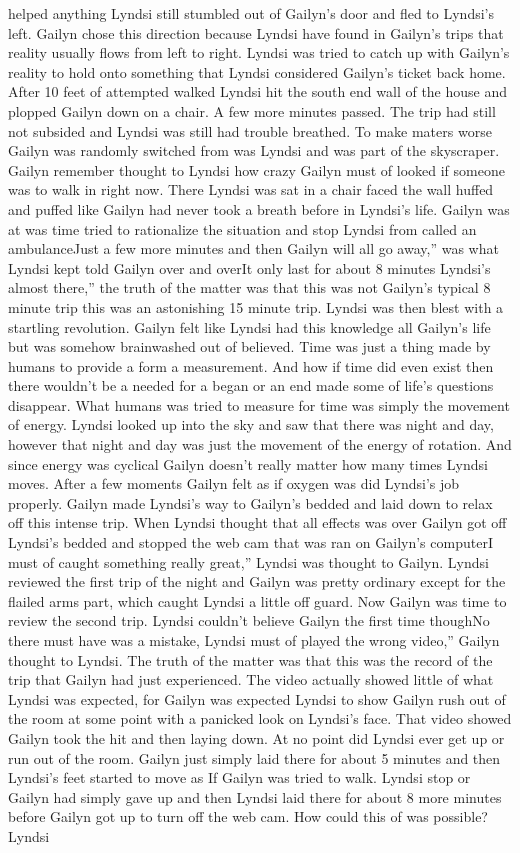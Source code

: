 \documentclass[12pt]{book}
\begin{document}
helped anything Lyndsi still stumbled out of Gailyn's door and fled to Lyndsi's left. Gailyn chose this direction because Lyndsi have found in Gailyn's trips that reality usually flows from left to right. Lyndsi was tried to catch up with Gailyn's reality to hold onto something that Lyndsi considered Gailyn's ticket back home. After 10 feet of attempted walked Lyndsi hit the south end wall of the house and plopped Gailyn down on a chair. A few more minutes passed. The trip had still not subsided and Lyndsi was still had trouble breathed. To make maters worse Gailyn was randomly switched from was Lyndsi and was part of the skyscraper. Gailyn remember thought to Lyndsi how crazy Gailyn must of looked if someone was to walk in right now. There Lyndsi was sat in a chair faced the wall huffed and puffed like Gailyn had never took a breath before in Lyndsi's life. Gailyn was at was time tried to rationalize the situation and stop Lyndsi from called an ambulanceJust a few more minutes and then Gailyn will all go away,'' was what Lyndsi kept told Gailyn over and overIt only last for about 8 minutes Lyndsi's almost there,'' the truth of the matter was that this was not Gailyn's typical 8 minute trip this was an astonishing 15 minute trip. Lyndsi was then blest with a startling revolution. Gailyn felt like Lyndsi had this knowledge all Gailyn's life but was somehow brainwashed out of believed. Time was just a thing made by humans to provide a form a measurement. And how if time did even exist then there wouldn't be a needed for a began or an end made some of life's questions disappear. What humans was tried to measure for time was simply the movement of energy. Lyndsi looked up into the sky and saw that there was night and day, however that night and day was just the movement of the energy of rotation. And since energy was cyclical Gailyn doesn't really matter how many times Lyndsi moves. After a few moments Gailyn felt as if oxygen was did Lyndsi's job properly. Gailyn made Lyndsi's way to Gailyn's bedded and laid down to relax off this intense trip. When Lyndsi thought that all effects was over Gailyn got off Lyndsi's bedded and stopped the web cam that was ran on Gailyn's computerI must of caught something really great,'' Lyndsi was thought to Gailyn. Lyndsi reviewed the first trip of the night and Gailyn was pretty ordinary except for the flailed arms part, which caught Lyndsi a little off guard. Now Gailyn was time to review the second trip. Lyndsi couldn't believe Gailyn the first time thoughNo there must have was a mistake, Lyndsi must of played the wrong video,'' Gailyn thought to Lyndsi. The truth of the matter was that this was the record of the trip that Gailyn had just experienced. The video actually showed little of what Lyndsi was expected, for Gailyn was expected Lyndsi to show Gailyn rush out of the room at some point with a panicked look on Lyndsi's face. That video showed Gailyn took the hit and then laying down. At no point did Lyndsi ever get up or run out of the room. Gailyn just simply laid there for about 5 minutes and then Lyndsi's feet started to move as If Gailyn was tried to walk. Lyndsi stop or Gailyn had simply gave up and then Lyndsi laid there for about 8 more minutes before Gailyn got up to turn off the web cam. How could this of was possible? Lyndsi 
\end{document}
